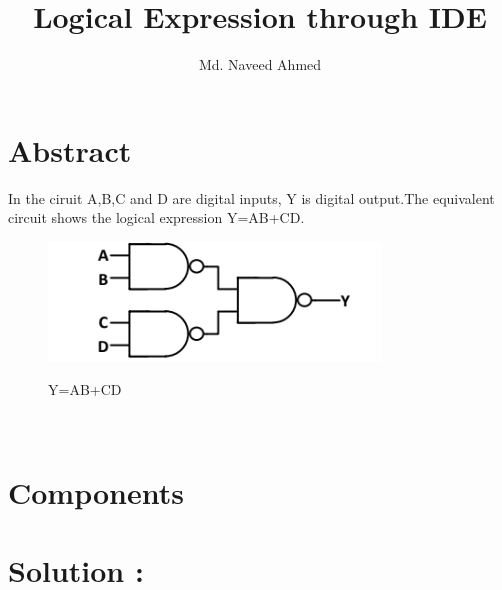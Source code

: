 \documentclass[journal,12pt,twocolumn]{IEEEtran}
\begin{document}
%

\theoremstyle{definition}
\newtheorem{theorem}{Theorem}[section]
\newtheorem{problem}{Problem}
\newtheorem{proposition}{Proposition}[section]
\newtheorem{lemma}{Lemma}[section]
\newtheorem{corollary}[theorem]{Corollary}
\newtheorem{example}{Example}[section]
\newtheorem{definition}{Definition}[section]
\newcommand{\BEQA}{\begin{eqnarray}}
\newcommand{\EEQA}{\end{eqnarray}}
\newcommand{\define}{\stackrel{\triangle}{=}}
\vspace{2cm}
\title{ 
Logical Expression through IDE
}

\author{Md. Naveed Ahmed}


\maketitle
\tableofcontents
\bigskip
%
\section{Abstract}

In the ciruit A,B,C and D are digital inputs, Y is digital output.The equivalent circuit shows the logical expression Y=AB+CD.
\begin{figure}[h]
    \centering
    \includegraphics[scale=0.8]{../figures/log_exp.png}\\
    \caption{Y=AB+CD}
\end{figure}\\
\section{\textbf{Components}}

\begin{table}[!h]
\centering
\caption{}
\label{table:7447_disp}
\end{table}
\section{\textbf{Solution :}}
\end{document}
